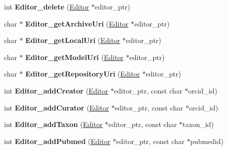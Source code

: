 \begin{DoxyCompactItemize}
int {\bfseries Editor\+\_\+delete} (\hyperlink{classomexmeta_1_1Editor}{Editor} $\ast$editor\+\_\+ptr)
\item 
\mbox{\label{namespaceomexmeta_ad0a68ce47a12363204bde49b838cd5d0}} 
char $\ast$ {\bfseries Editor\+\_\+get\+Archive\+Uri} (\hyperlink{classomexmeta_1_1Editor}{Editor} $\ast$editor\+\_\+ptr)
\item 
\mbox{\label{namespaceomexmeta_a28c678eeb0c4457bbbd671eb2dac73d0}} 
char $\ast$ {\bfseries Editor\+\_\+get\+Local\+Uri} (\hyperlink{classomexmeta_1_1Editor}{Editor} $\ast$editor\+\_\+ptr)
\item 
\mbox{\label{namespaceomexmeta_aaddb4c2e6bc636650b20c2eb526ff691}} 
char $\ast$ {\bfseries Editor\+\_\+get\+Model\+Uri} (\hyperlink{classomexmeta_1_1Editor}{Editor} $\ast$editor\+\_\+ptr)
\item 
\mbox{\label{namespaceomexmeta_afc5399a7743a7ddbb79a903ca5676170}} 
char $\ast$ {\bfseries Editor\+\_\+get\+Repository\+Uri} (\hyperlink{classomexmeta_1_1Editor}{Editor} $\ast$editor\+\_\+ptr)
\item 
\mbox{\label{namespaceomexmeta_a7b612eade9eb34450ea88ef85657c838}} 
int {\bfseries Editor\+\_\+add\+Creator} (\hyperlink{classomexmeta_1_1Editor}{Editor} $\ast$editor\+\_\+ptr, const char $\ast$orcid\+\_\+id)
\item 
\mbox{\label{namespaceomexmeta_a86cf5fb8f670b0b648162ddfbe5d8a02}} 
int {\bfseries Editor\+\_\+add\+Curator} (\hyperlink{classomexmeta_1_1Editor}{Editor} $\ast$editor\+\_\+ptr, const char $\ast$orcid\+\_\+id)
\item 
\mbox{\label{namespaceomexmeta_a5f46902a5da35486989b7e74c42c451a}} 
int {\bfseries Editor\+\_\+add\+Taxon} (\hyperlink{classomexmeta_1_1Editor}{Editor} $\ast$editor\+\_\+ptr, const char $\ast$taxon\+\_\+id)
\item 
\mbox{\label{namespaceomexmeta_a8a2613943915dc228a4b53de2423ba62}} 
int {\bfseries Editor\+\_\+add\+Pubmed} (\hyperlink{classomexmeta_1_1Editor}{Editor} $\ast$editor\+\_\+ptr, const char $\ast$pubmedid)
\item 

\end{DoxyCompactItemize}
